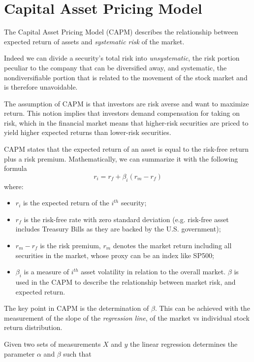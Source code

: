 \section{Capital Asset Pricing Model}
\label{sec:capm}
The Capital Asset Pricing Model (CAPM) describes the relationship between expected return of assets and \emph{systematic risk} of the market.

Indeed we can divide a security’s total risk into \emph{unsystematic}, the risk portion peculiar to the company that can be diversified away, and systematic, the nondiversifiable portion that is related to the movement of the stock market and is therefore unavoidable. 

The assumption of CAPM is that investors are risk averse and want to maximize return. This notion implies that investors demand compensation for taking on risk, which in the financial market means that higher-risk securities are priced to yield higher expected returns than lower-risk securities. 

CAPM states that the expected return of an asset is equal to the risk-free return plus a risk premium. 
Mathematically, we can summarize it with the following formula
\begin{equation}
r_i = r_f + \beta_i(r_m-r_f)
\label{eq:capm}
\end{equation}
where:
\begin{itemize}
	\item $r_i$ is the expected return of the $i^{th}$ security;
	\item $r_f$ is the risk-free rate with zero standard deviation (e.g. risk-free asset includes Treasury Bills as they are backed by the U.S. government);
	\item $r_m - r_f$ is the risk premium, $r_m$ denotes the market return including all securities in the market, whose proxy can be an index like SP500;
	\item $\beta_i$ is a measure of $i^{th}$ asset volatility in relation to the overall market. 
	$\beta$ is used in the CAPM to describe the relationship between market risk, and expected return.
\end{itemize}
	
The key point in CAPM is the determination of $\beta$. This can be achieved with the measurement of the slope of the \emph{regression line}, of the market vs individual stock return distribution.

Given two sets of measurements $X$ and $y$ the linear regression determines the parameter $\alpha$ and $\beta$ such that

